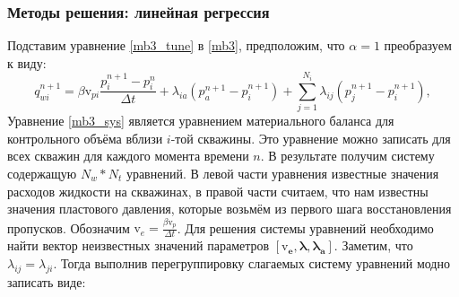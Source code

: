 \documentclass[14pt]{article}
\begin{document}
\subsubsection{Методы решения: линейная регрессия} 
Подставим уравнение \ref{mb3_tune} в \ref{mb3}, предположим, что $\alpha = 1$ преобразуем к виду:
\begin{equation}\label{mb3_sys}
	q_{wi}^{n+1} =  \beta \mathrm{v}_{pi}\frac{p_i^{n+1} - p_i^n}{\Delta t} + \lambda_{ia} \left(p_a^{n+1} - p_i^{n+1}\right) +  \sum_{j=1}^{N_i}\lambda_{ij} \left(p_j^{n+1} - p_i^{n+1}\right),
\end{equation}
Уравнение \ref{mb3_sys} является уравнением материального баланса для контрольного объёма вблизи $i$-той скважины. Это уравнение можно записать для всех скважин для каждого момента времени $n$. В результате получим систему содержащую $N_w * N_t$ уравнений. В левой части уравнения известные значения расходов жидкости на скважинах, в правой части считаем, что нам известны значения пластового давления, которые возьмём из первого шага восстановления пропусков. Обозначим $\mathrm{v}_e = \frac{\beta \mathrm{v}_p}{\Delta t}$. Для решения системы уравнений необходимо найти вектор неизвестных значений параметров $[\boldsymbol{\mathrm{v}_e}, \boldsymbol{\lambda}, \boldsymbol{\lambda_a}]$. Заметим, что $\lambda_{ij} = \lambda_{ji}$. Тогда выполнив перегруппировку слагаемых систему уравнений модно записать виде:
\end{document}
